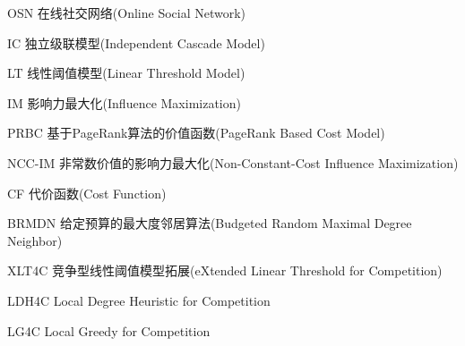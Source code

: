 \begin{denotation}

\item[OSN] 在线社交网络(Online Social Network)
\item[IC] 独立级联模型(Independent Cascade Model)
\item[LT] 线性阈值模型(Linear Threshold Model)
\item[IM] 影响力最大化(Influence Maximization)
\item[PRBC] 基于PageRank算法的价值函数(PageRank Based Cost Model)
\item[NCC-IM] 非常数价值的影响力最大化(Non-Constant-Cost Influence Maximization)
\item[CF] 代价函数(Cost Function)
\item[BRMDN] 给定预算的最大度邻居算法(Budgeted Random Maximal Degree Neighbor)
\item[XLT4C] 竞争型线性阈值模型拓展(eXtended Linear Threshold for Competition)
\item[LDH4C] Local Degree Heuristic for Competition
\item[LG4C] Local Greedy for Competition

\end{denotation}
